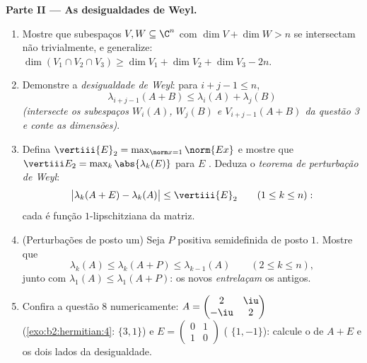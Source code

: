 \begin{problem}
\medskip
\noindent\textbf{Parte II --- As desigualdades de Weyl.}
\begin{enumerate}[resume]
  \item Mostre que subespaços $V, W \subseteq \C^n$ com $\dim V
        + \dim W > n$ se intersectam não trivialmente, e generalize:
        $\dim(V_1 \cap V_2 \cap V_3) \geq \dim V_1 + \dim V_2 +
        \dim V_3 - 2n$.
  \item Demonstre a \emph{desigualdade de Weyl}: para $i + j - 1 \leq n$,
        \[
        \lambda_{i+j-1}(A + B) \leq \lambda_i(A) +
        \lambda_j(B)
        \]
        \emph{(intersecte os subespaços $W_i(A)$, $W_j(B)$ e
        $V_{i+j-1}(A+B)$ da questão 3 e conte as
        dimensões)}.
  \item Defina $\vertiii{E}_2 = \max_{\norm x = 1}\norm{Ex}$
        e mostre que $\vertiii E_2 = \max_k\abs{\lambda_k(E)}$ para
        $E$ . Deduza o \emph{teorema de perturbação
        de Weyl}:
        \[
        \bigl|\lambda_k(A + E) - \lambda_k(A)\bigr| \leq
        \vertiii{E}_2
        \qquad (1 \leq k \leq n) :
        \]
        cada  é função $1$-lipschitziana da
        matriz.
  \item (Perturbações de posto um) Seja $P$  positiva
        semidefinida de posto $1$. Mostre que
        \[
        \lambda_k(A) \leq \lambda_k(A + P) \leq
        \lambda_{k-1}(A) \qquad (2 \leq k \leq n),
        \]
        junto com $\lambda_1(A) \leq \lambda_1(A+P)$: os
        novos  \emph{entrelaçam} os antigos.
  \item Confira a questão 8 numericamente: $A = \begin{pmatrix} 2 &
        \iu\\ -\iu & 2\end{pmatrix}$
        (\cref{exo:b2:hermitian:4}:  $\{3, 1\}$) e
        $E = \begin{pmatrix} 0 & 1\\ 1 & 0\end{pmatrix}$
        ( $\{1, -1\}$): calcule o  de $A +
        E$ e os dois lados da desigualdade.
\end{enumerate}


\end{problem}
